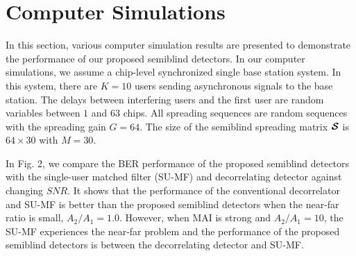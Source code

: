 \documentclass[a4paper,10pt,fleqn, twocolumn]{IEEETran}
\newcommand{\bcS}{{\mbox {\boldmath ${\cal S}$}}}
\begin{document}
\section{Computer Simulations}
In this section, various computer simulation results are presented
to demonstrate the performance of our proposed semiblind
detectors. In our computer simulations, we assume a chip-level
synchronized single base station system. In this system, there are
$K=10$ users sending asynchronous signals to the base station. The
delays between interfering users and the first user are random
variables between $1$ and $63$ chips. All spreading sequences are
random sequences with the spreading gain $G=64$. The size of the
semiblind spreading matrix $\bcS$ is $64\times30$ with $M=30$.
\begin{figure} \label{BER_SNR}
\end{figure}
In Fig. 2, we compare the BER performance of the proposed
semiblind detectors with the single-user matched filter (SU-MF)
and decorrelating detector against changing $SNR$. It shows that
the performance of the conventional decorrelator and SU-MF is
better than the proposed semiblind detectors when the near-far
ratio is small, $A_2/A_1=1.0$. However, when MAI is strong and
$A_2/A_1=10$, the SU-MF experiences the near-far problem and the
performance of the proposed semiblind detectors is between the
decorrelating detector and SU-MF.
\begin{figure} \label{BER_NFR}
\end{figure}
\end{document}

